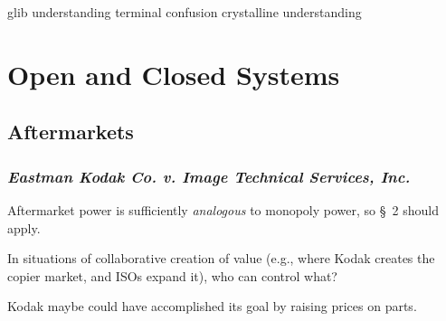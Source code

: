 glib understanding
terminal confusion
crystalline understanding

\section{Open and Closed Systems}

\subsection{Aftermarkets}

\subsubsection{\emph{Eastman Kodak Co. v. Image Technical Services, Inc.}}

Aftermarket power is sufficiently \emph{analogous} to monopoly power, so \S\ 2 
should apply.

In situations of collaborative creation of value (e.g., where Kodak creates 
the copier market, and ISOs expand it), who can control what?

Kodak maybe could have accomplished its goal by raising prices on parts.


